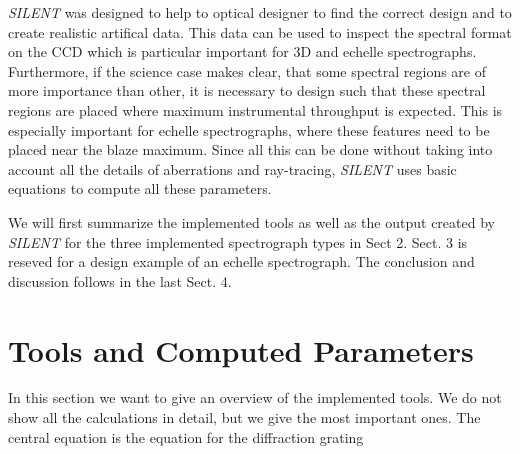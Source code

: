 \documentclass[preprint,12pt,authoryear]{elsarticle}
\begin{document}
\textit{SILENT} was designed to help to optical designer to find the correct design and to create realistic artifical data. This data can be
used to inspect the spectral format on the CCD which is particular important for 3D and echelle spectrographs. Furthermore, if the science case
makes clear, that some spectral regions are of more importance than other, it is necessary to design such that these spectral regions are placed
where maximum instrumental throughput is expected. This is especially important for echelle spectrographs, where these features need to be placed
near the blaze maximum. Since all this can be done without taking into account all the details of aberrations and ray-tracing, \textit{SILENT} uses
basic equations to compute all these parameters.

We will first summarize the implemented tools as well as the output created by \textit{SILENT} for the three implemented spectrograph types in Sect 2.
Sect. 3 is reseved for a design example of an echelle spectrograph. The conclusion and discussion follows in the last Sect. 4.

\section{Tools and Computed Parameters}

In this section we want to give an overview of the implemented tools. We do not show all the calculations in detail, but we give the most important ones. The central equation is the
equation for the diffraction grating
\end{document}
